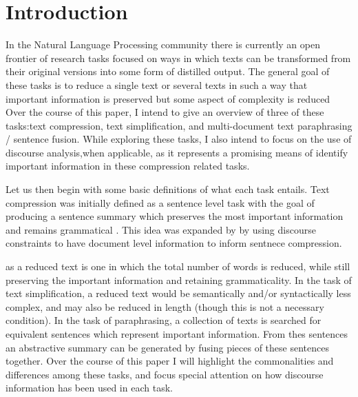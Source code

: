 \section{Introduction}

\iffalse
{Talk about what the three different categories are, and how they can be differentiated from each other.  (this should be about 2 paragraphs).  
Then talk about what commonalities each category has with the others(this can be again 1-2 paragraphs) }
\fi


{In the Natural Language Processing community there is currently an open frontier of research tasks focused on ways in which texts can be transformed from their original versions into some form of distilled output.  The general goal of these tasks is to reduce a single text or several texts in such a way that important information is preserved but some aspect of complexity is reduced  Over the course of this paper, I intend to give an overview of three of these tasks:text compression, text simplification, and multi-document text paraphrasing / sentence fusion.  While exploring these tasks, I also intend to focus on the use of discourse analysis,when applicable, as it represents a promising means of identify important information in these compression related tasks.}


{Let us then begin with some basic definitions of what each task entails.  Text compression was initially defined as a sentence level task with the goal of producing a sentence summary which preserves the most important information and remains grammatical \citet{Jing2000}.  This idea was expanded by \citet{Clarke&Lapata2010} by using discourse constraints to have document level information to inform sentnece compression.  }


 {as a reduced text is one in which the total number of words is reduced, while still preserving the important information and retaining grammaticality.  In the task of text simplification, a reduced text would be semantically and/or syntactically less complex, and may also be reduced in length (though this is not a necessary condition).  In the task of paraphrasing, a collection of texts is searched for equivalent sentences which represent important information. From thes sentences an abstractive summary can be generated by fusing pieces of these sentences together.
Over the course of this paper I will highlight the commonalities and differences among these tasks, and focus special attention on how discourse information has been used in each task.}


